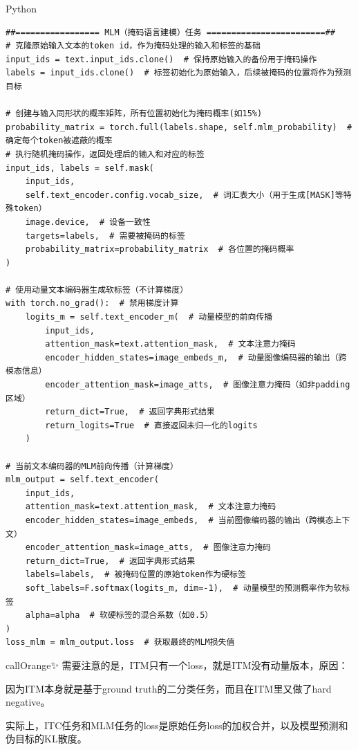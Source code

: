\documentclass[zihao=false,fontset=windows]{ctexart}
\begin{document}
\begin{feishucode}
{\small\ttfamily\color{feishuGray}Python}\par\vspace{-0.15em}
\begin{lstlisting}
##================= MLM（掩码语言建模）任务 ========================##                
# 克隆原始输入文本的token id，作为掩码处理的输入和标签的基础
input_ids = text.input_ids.clone()  # 保持原始输入的备份用于掩码操作
labels = input_ids.clone()  # 标签初始化为原始输入，后续被掩码的位置将作为预测目标

# 创建与输入同形状的概率矩阵，所有位置初始化为掩码概率(如15%)
probability_matrix = torch.full(labels.shape, self.mlm_probability)  # 确定每个token被遮蔽的概率                    
# 执行随机掩码操作，返回处理后的输入和对应的标签
input_ids, labels = self.mask(
    input_ids, 
    self.text_encoder.config.vocab_size,  # 词汇表大小（用于生成[MASK]等特殊token）
    image.device,  # 设备一致性
    targets=labels,  # 需要被掩码的标签
    probability_matrix=probability_matrix  # 各位置的掩码概率
) 

# 使用动量文本编码器生成软标签（不计算梯度）
with torch.no_grad():  # 禁用梯度计算
    logits_m = self.text_encoder_m(  # 动量模型的前向传播
        input_ids, 
        attention_mask=text.attention_mask,  # 文本注意力掩码
        encoder_hidden_states=image_embeds_m,  # 动量图像编码器的输出（跨模态信息）
        encoder_attention_mask=image_atts,  # 图像注意力掩码（如非padding区域）    
        return_dict=True,  # 返回字典形式结果
        return_logits=True  # 直接返回未归一化的logits
    )    

# 当前文本编码器的MLM前向传播（计算梯度）
mlm_output = self.text_encoder(
    input_ids, 
    attention_mask=text.attention_mask,  # 文本注意力掩码
    encoder_hidden_states=image_embeds,  # 当前图像编码器的输出（跨模态上下文）
    encoder_attention_mask=image_atts,  # 图像注意力掩码    
    return_dict=True,  # 返回字典形式结果
    labels=labels,  # 被掩码位置的原始token作为硬标签
    soft_labels=F.softmax(logits_m, dim=-1),  # 动量模型的预测概率作为软标签
    alpha=alpha  # 软硬标签的混合系数（如0.5）
)                           
loss_mlm = mlm_output.loss  # 获取最终的MLM损失值
\end{lstlisting}
\end{feishucode}
\vspace{0.45em}
\begin{feishubox}{callOrange}{✨}
需要注意的是，ITM只有一个loss，就是ITM没有动量版本，原因：\par
因为ITM本身就是基于ground truth的二分类任务，而且在ITM里又做了hard negative。\par
实际上，ITC任务和MLM任务的loss是原始任务loss的加权合并，以及模型预测和伪目标的KL散度。\par
\end{feishubox}
\end{document}
